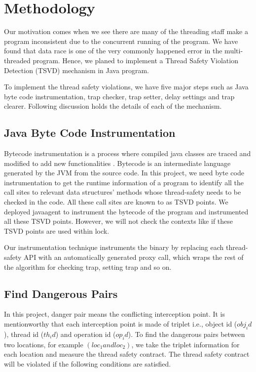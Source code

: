 \section{Methodology}
\label{sec:method}
Our motivation comes when we see there are many of the threading staff make a
program inconsistent due to the concurrent running of the program. We have
found that data race is one of the very commonly happened error in the
multi-threaded program. Hence, we planed to implement a Thread Safety Violation
Detection (TSVD) mechanism in Java program.  

To implement the thread safety violations, we have five major steps such as
Java byte code instrumentation, trap checker,  trap setter,  delay settings and
trap clearer. Following discussion holds the details of each of the mechanism. 

\subsection{Java Byte Code Instrumentation}
Bytecode instrumentation is a process where compiled java classes are traced
and modified to add new functionalities \cite{}. Bytecode is an intermediate
language generated by the JVM from the source code. In this project, we need
byte code instrumentation to get the runtime information of a program to
identify all the call sites to relevant data structures' methods whose
thread-safety needs to be checked in the code. All these call sites are known
to as TSVD points. We deployed javaagent to instrument the bytecode of the
program and instrumented all these TSVD points. However, we will not check the
contexts like if these TSVD points are used within lock.

Our instrumentation technique instruments the binary by replacing each thread-safety
API with an automatically generated proxy call, which wraps the rest of the algorithm for checking trap, setting trap and so on.


\subsection{Find Dangerous Pairs}
In this project, danger pair means the conflicting interception point. It is
mentionworthy that each interception point is made of triplet i.e., object id
($obj_id$), thread id ($th_id$) and operation id ($op_id$). To find the dangerous pairs between two locations, for example $(loc_1 and loc_2)$, we take the triplet information for each location and measure the thread safety contract. The thread safety contract will be violated if the following conditions are satisfied. 


